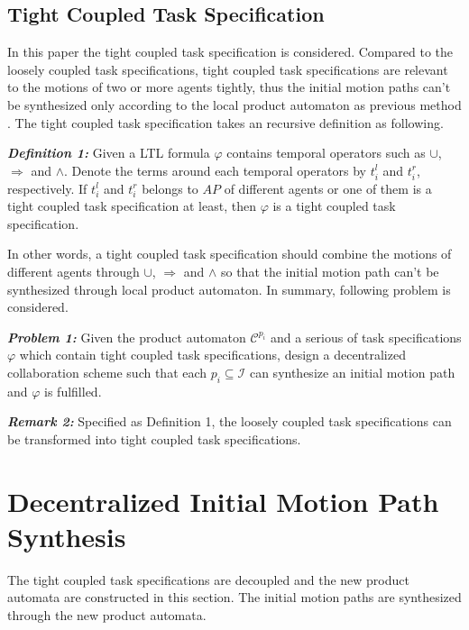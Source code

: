 \documentclass[journal]{IEEEtran}
\begin{document}
\subsection{Tight Coupled Task Specification}
In this paper the tight coupled task specification is considered. Compared to the loosely coupled task specifications, tight coupled task specifications are relevant to the motions of two or more agents tightly, thus the initial motion paths can't be synthesized only according to the local product automaton as previous method \cite{guo2017task}. The tight coupled task specification takes an recursive definition as following.
\par
\textbf{\emph{Definition 1:}} Given a LTL formula $\varphi$ contains temporal operators such as $\cup$, $\Longrightarrow$ and $\wedge$. Denote the terms around each temporal operators by $t^{l}_i$ and $t^{r}_i$, respectively. If $t^{l}_i$ and $t^{r}_i$ belongs to $AP$ of different agents or one of them is a tight coupled task specification at least, then $\varphi$ is a tight coupled task specification.
\par
In other words, a tight coupled task specification should combine the motions of different agents through $\cup$, $\Longrightarrow$ and $\wedge$ so that the initial motion path can't be synthesized through local product automaton. In summary, following problem is considered.
\par
\textbf{\emph{Problem 1:}} Given the product automaton $\mathcal{C}^{p_i}$ and a serious of task specifications $\varphi$ which contain tight coupled task specifications, design a decentralized collaboration scheme such that each $p_i \subseteq \mathcal{I}$ can synthesize an initial motion path and $\varphi$ is fulfilled.

\textbf{\emph{Remark 2:}} Specified as Definition 1, the loosely coupled task specifications can be transformed into tight coupled task specifications.
\section{Decentralized Initial Motion Path Synthesis}
The tight coupled task specifications are decoupled and the new product automata are constructed in this section. The initial motion paths are synthesized through the new product automata.
\end{document}

